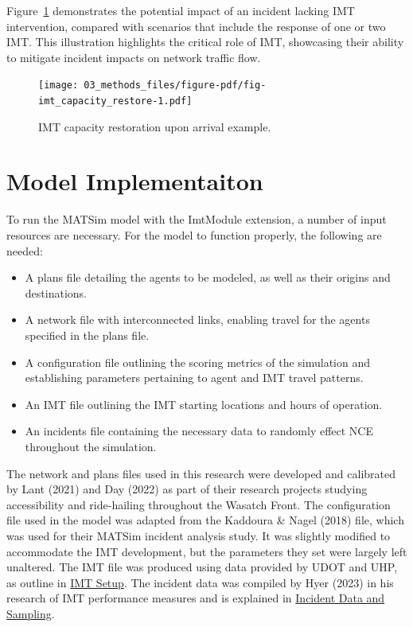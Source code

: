 \documentclass[fancy, oneside, mastersfancy, ms]{byuthesis}
\providecommand{\tightlist}{%
  \setlength{\itemsep}{0pt}\setlength{\parskip}{0pt}}\usepackage{longtable,booktabs,array}
\begin{document}
Figure~\ref{fig-imt_capacity_restore} demonstrates the potential impact
of an incident lacking IMT intervention, compared with scenarios that
include the response of one or two IMT. This illustration highlights the
critical role of IMT, showcasing their ability to mitigate incident
impacts on network traffic flow.

\begin{figure}

{\centering \texttt{[image: 03\_methods\_files/figure-pdf/fig-imt\_capacity\_restore-1.pdf]}

}

\caption{\label{fig-imt_capacity_restore}IMT capacity restoration upon
arrival example.}

\end{figure}

\hypertarget{sec-model_imp}{%
\section{Model Implementaiton}\label{sec-model_imp}}

To run the MATSim model with the ImtModule extension, a number of input
resources are necessary. For the model to function properly, the
following are needed:

\begin{itemize}
\tightlist
\item
  A plans file detailing the agents to be modeled, as well as their
  origins and destinations.
\item
  A network file with interconnected links, enabling travel for the
  agents specified in the plans file.
\item
  A configuration file outlining the scoring metrics of the simulation
  and establishing parameters pertaining to agent and IMT travel
  patterns.
\item
  An IMT file outlining the IMT starting locations and hours of
  operation.
\item
  An incidents file containing the necessary data to randomly effect NCE
  throughout the simulation.
\end{itemize}

The network and plans files used in this research were developed and
calibrated by Lant (2021) and Day (2022) as part of their research
projects studying accessibility and ride-hailing throughout the Wasatch
Front. The configuration file used in the model was adapted from the
Kaddoura \& Nagel (2018) file, which was used for their MATSim incident
analysis study. It was slightly modified to accommodate the IMT
development, but the parameters they set were largely left unaltered.
The IMT file was produced using data provided by UDOT and UHP, as
outline in \protect\hyperlink{sec-MATSim_mod}{IMT Setup}. The incident
data was compiled by Hyer (2023) in his research of IMT performance
measures and is explained in \protect\hyperlink{sec-inc_data}{Incident
Data and Sampling}.
\end{document}

